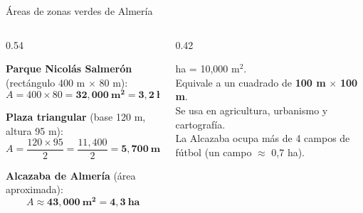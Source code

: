 \documentclass[aspectratio=169, 10pt, spanish]{beamer}
\begin{document}
\begin{frame}{Áreas de zonas verdes de Almería}
  \begin{columns}[t]
    \begin{column}{0.54\textwidth}
      \begin{ejemplobox}
        \AlmFontSmall
        \textbf{Parque Nicolás Salmerón}
        (rectángulo 400 m $\times$ 80 m):
        \[A = 400 \times 80 = \mathbf{32{,}000\ m^2} = \mathbf{3{,}2\ ha}\]

        \vspace{0.1cm}
        \textbf{Plaza triangular} (base 120 m, altura 95 m):
        \[A = \frac{120 \times 95}{2} = \frac{11{,}400}{2}
          = \mathbf{5{,}700\ m^2}\]

        \vspace{0.1cm}
        \textbf{Alcazaba de Almería}
        (área aproximada):
        \[A \approx \mathbf{43{,}000\ m^2} = \mathbf{4{,}3\ ha}\]
      \end{ejemplobox}
    \end{column}
    \begin{column}{0.42\textwidth}
      \begin{notabox}
         ha = 10{,}000 m$^2$.
        \\[4pt]
        Equivale a un cuadrado de
        \textbf{100 m} $\times$ \textbf{100 m}.
        \\[4pt]
        Se usa en agricultura, urbanismo
        y cartografía.
        \\[4pt]
        La Alcazaba ocupa más de 4 campos
        de fútbol (un campo $\approx$ 0{,}7 ha).
      \end{notabox}
    \end{column}
  \end{columns}
\end{frame}
\end{document}
